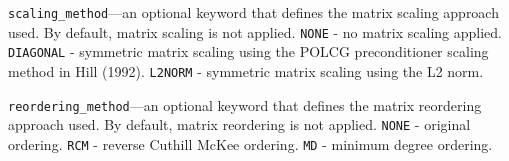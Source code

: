 \begin{description}
\item \texttt{scaling\_method}---an optional keyword that defines the matrix scaling approach used. By default, matrix scaling is not applied.  \texttt{NONE} - no matrix scaling applied.  \texttt{DIAGONAL} - symmetric matrix scaling using the POLCG preconditioner scaling method in Hill (1992).  \texttt{L2NORM} - symmetric matrix scaling using the L2 norm.

\item \texttt{reordering\_method}---an optional keyword that defines the matrix reordering approach used. By default, matrix reordering is not applied.  \texttt{NONE} - original ordering.  \texttt{RCM} - reverse Cuthill McKee ordering.  \texttt{MD} - minimum degree ordering.

\end{description}

